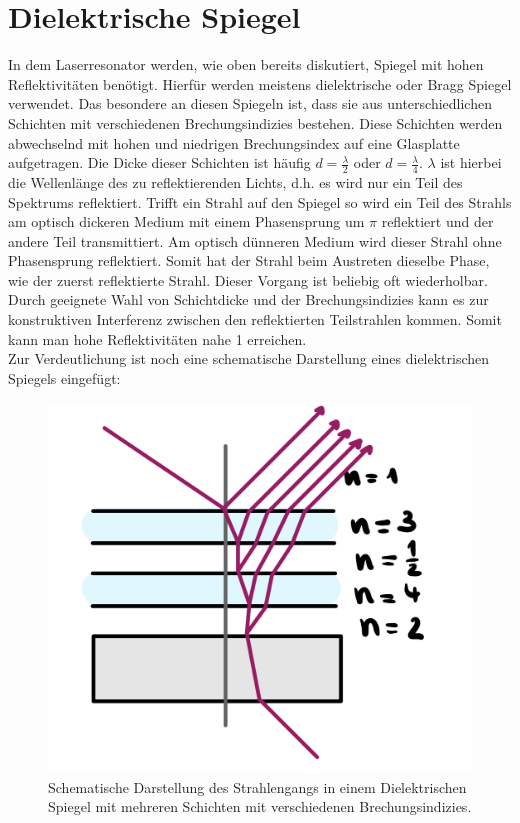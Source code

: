 \section{Dielektrische Spiegel}
In dem Laserresonator werden, wie oben bereits diskutiert, Spiegel mit hohen Reflektivitäten benötigt. 
Hierfür werden meistens dielektrische oder Bragg Spiegel verwendet. 
Das besondere an diesen Spiegeln ist, dass sie aus unterschiedlichen Schichten mit verschiedenen Brechungsindizies bestehen.
Diese Schichten werden abwechselnd mit hohen und niedrigen Brechungsindex auf eine Glasplatte aufgetragen. 
Die Dicke dieser Schichten ist häufig $d = \frac{\lambda}{2}$ oder $d=\frac{\lambda}{4}$. 
$\lambda$ ist hierbei die Wellenlänge des zu reflektierenden Lichts, d.h. es wird nur ein Teil des Spektrums reflektiert.
Trifft ein Strahl auf den Spiegel so wird ein Teil des Strahls am optisch dickeren Medium mit einem Phasensprung 
um $\pi$ reflektiert und der andere Teil transmittiert. Am optisch dünneren Medium wird dieser Strahl ohne Phasensprung reflektiert. 
Somit hat der Strahl beim Austreten dieselbe Phase, wie der zuerst reflektierte Strahl. Dieser Vorgang ist beliebig oft wiederholbar.
Durch geeignete Wahl von Schichtdicke und der Brechungsindizies kann es zur konstruktiven Interferenz zwischen den reflektierten 
Teilstrahlen kommen. Somit kann man hohe Reflektivitäten nahe 1 erreichen. \citep[vgl.][]{spiegel}\\
Zur Verdeutlichung ist noch eine schematische Darstellung eines dielektrischen Spiegels eingefügt:
\begin{figure}[h]
    \centering
    \includegraphics[scale=0.13]{Bilder/FzV/spiegel.jpg}
    \caption{Schematische Darstellung des Strahlengangs in einem Dielektrischen Spiegel mit mehreren Schichten mit verschiedenen Brechungsindizies.}
\end{figure}
